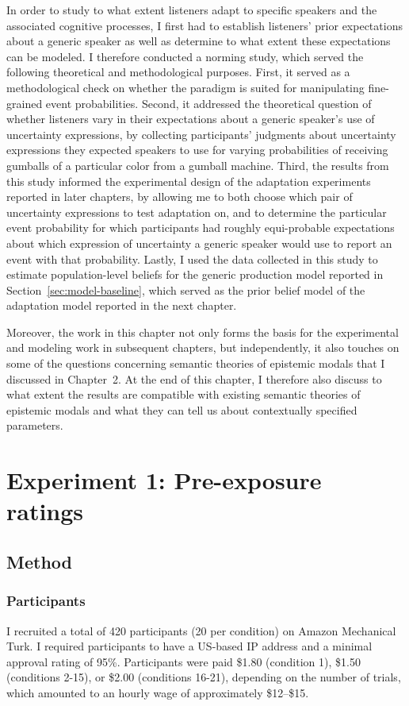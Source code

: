 In order to study to what extent listeners adapt to specific speakers and the associated cognitive processes, 
I first had to establish
listeners' prior expectations about a generic speaker as well as determine to what extent these expectations can be modeled.
I therefore conducted a norming study, which served the following theoretical and methodological purposes.
First, it served as a methodological check on whether the paradigm is suited for 
manipulating fine-grained event probabilities. 
Second, it addressed the theoretical question of whether listeners vary in their expectations about
a generic speaker's use of uncertainty expressions, by collecting participants' judgments about 
uncertainty expressions they expected speakers to use for varying probabilities of receiving gumballs of a particular color from a gumball machine. 
Third,  the results from this study informed the experimental design of the adaptation experiments 
reported in later chapters, by allowing me to both choose which pair of uncertainty expressions to test adaptation on, 
and to determine the particular event probability for which participants had roughly equi-probable expectations 
about which expression of uncertainty a generic speaker would use to report an event with that probability. 
Lastly, I used the data collected in this study to 
estimate population-level beliefs for the generic production model reported in 
Section~\ref{sec:model-baseline}, which served as the prior belief model of the
adaptation model reported in the next chapter.

Moreover, the work in this chapter not only forms the basis for the experimental and modeling work in subsequent chapters,
but independently, it also touches on some of the questions concerning
semantic theories of epistemic modals that I discussed in Chapter~2. At the end of this
chapter, I therefore also discuss to what extent the results are compatible with existing semantic theories of epistemic modals
and what they can tell us about contextually specified parameters. 


\section{Experiment 1: Pre-exposure ratings}
\label{sec:exp-norming}

\subsection{Method}

\subsubsection{Participants}
I recruited a total of 420 participants 
(20 per condition) on Amazon Mechanical Turk. 
I required participants to have a US-based IP address and a minimal approval rating of 95\%.
Participants were paid \$1.80 (condition 1), \$1.50 (conditions 2-15),
or \$2.00 (conditions 16-21),
depending on the number of trials,
which amounted to an hourly wage of approximately \$12--\$15. 


